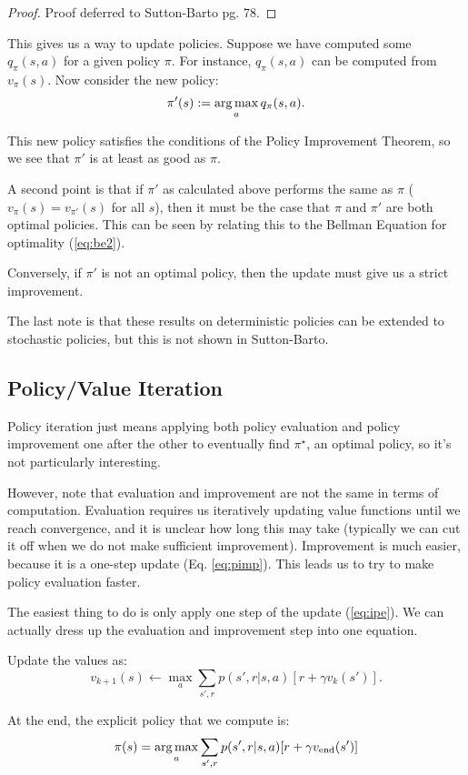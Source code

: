 \documentclass{article}
\begin{document}
\begin{proof}
Proof deferred to Sutton-Barto pg. 78.
\end{proof}

This gives us a way to update policies. Suppose we have computed some $q_\pi(s,a)$ for a given policy $\pi$. For instance, $q_\pi(s,a)$ can be computed from $v_\pi(s)$. Now consider the new policy:
\begin{equation}
    \pi'(s) := \operatorname*{arg\,max}_a q_\pi(s,a).\label{eq:pimp}
\end{equation}

This new policy satisfies the conditions of the Policy Improvement Theorem, so we see that $\pi'$ is at least as good as $\pi$.

A second point is that if $\pi'$ as calculated above performs the same as $\pi$ ($v_\pi(s) = v_{\pi'}(s)$ for all $s$), then it must be the case that $\pi$ and $\pi'$ are both optimal policies. This can be seen by relating this to the Bellman Equation for optimality (\ref{eq:be2}).

Conversely, if $\pi'$ is not an optimal policy, then the update must give us a strict improvement.

The last note is that these results on deterministic policies can be extended to stochastic policies, but this is not shown in Sutton-Barto.

\subsection{Policy/Value Iteration}
Policy iteration just means applying both policy evaluation and policy improvement one after the other to eventually find $\pi^\star$, an optimal policy, so it's not particularly interesting.

However, note that evaluation and improvement are not the same in terms of computation. Evaluation requires us iteratively updating value functions until we reach convergence, and it is unclear how long this may take (typically we can cut it off when we do not make sufficient improvement). Improvement is much easier, because it is a one-step update (Eq. \ref{eq:pimp}). This leads us to try to make policy evaluation faster.

The easiest thing to do is only apply one step of the update (\ref{eq:ipe}). We can actually dress up the evaluation and improvement step into one equation.

\begin{definition}
Update the values as:
\begin{equation}
v_{k+1}(s) \leftarrow \max_a \sum_{s',r} p(s',r|s,a) [r+\gamma v_k(s')]. 
\end{equation}

At the end, the explicit policy that we compute is:
\begin{equation}
    \pi(s) = \operatorname*{arg\,max}_a \sum_{s',r} p(s',r|s,a) [r+\gamma v_\text{end}(s')]
\end{equation}

\end{definition}
\end{document}
